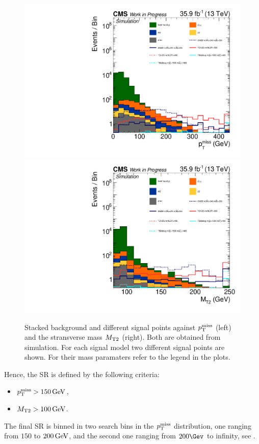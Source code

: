 \begin{figure}[tbp]
 \centering
 \includegraphics[width=\pairwidth]{figures/mt2/onZ_LL_met_log}
 \includegraphics[width=\pairwidth]{figures/mt2/onZ_LL_mt2_log}
 \caption{Stacked background and different signal points against $p_{\mathrm{T}}^\text{miss}$ (left) and the stransverse mass $M_{\mathrm{T2}}$ (right). Both are obtained from simulation. For each signal model two different signal points are shown. For their mass paramaters refer to the legend in the plots.}
 \label{fig:SRvariables}
\end{figure}
Hence, the SR is defined by the following criteria:
\begin{itemize}
 \item $p_{\mathrm{T}}^\text{miss}>150\,\text{Ge\hspace{-.08em}V}$,
 \item $M_{\mathrm{T2}}>100\,\text{Ge\hspace{-.08em}V}$.
\end{itemize}
The final SR is binned in two search bins in the $p_{\mathrm{T}}^\text{miss}$ distribution, one ranging from $150$ to $200\,\text{Ge\hspace{-.08em}V}$, and the second one ranging from $200\Gev$ to infinity, see .


